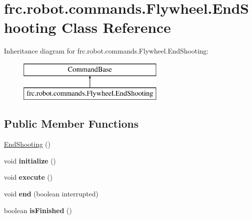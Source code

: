 \hypertarget{classfrc_1_1robot_1_1commands_1_1_flywheel_1_1_end_shooting}{}\section{frc.\+robot.\+commands.\+Flywheel.\+End\+Shooting Class Reference}
\label{classfrc_1_1robot_1_1commands_1_1_flywheel_1_1_end_shooting}
Inheritance diagram for frc.\+robot.\+commands.\+Flywheel.\+End\+Shooting\+:\begin{figure}[H]
\begin{center}
\leavevmode
\includegraphics[height=2.000000cm]{classfrc_1_1robot_1_1commands_1_1_flywheel_1_1_end_shooting}
\end{center}
\end{figure}
\subsection*{Public Member Functions}
\begin{DoxyCompactItemize}
\item 
\mbox{\hyperlink{classfrc_1_1robot_1_1commands_1_1_flywheel_1_1_end_shooting_a4a77b898b754ea3f333051eb7a982f11}{End\+Shooting}} ()
\item 
\mbox{\label{classfrc_1_1robot_1_1commands_1_1_flywheel_1_1_end_shooting_a1021b191c4ee1755f607b95d72fdaf44}} 
void {\bfseries initialize} ()
\item 
\mbox{\label{classfrc_1_1robot_1_1commands_1_1_flywheel_1_1_end_shooting_a50c78a020ff4e8a7c3f51cd316795e19}} 
void {\bfseries execute} ()
\item 
\mbox{\label{classfrc_1_1robot_1_1commands_1_1_flywheel_1_1_end_shooting_aa5e097ec4413f1c9ae144df5ddd30378}} 
void {\bfseries end} (boolean interrupted)
\item 
\mbox{\label{classfrc_1_1robot_1_1commands_1_1_flywheel_1_1_end_shooting_ae69d8dcffb2f83178fc11db229e9ac09}} 
boolean {\bfseries is\+Finished} ()
\end{DoxyCompactItemize}


